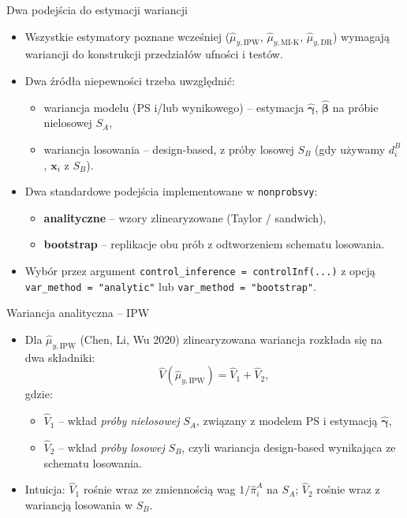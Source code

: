 \documentclass[10pt,ignorenonframetext, aspectratio=169]{beamer}
\newcommand{\bx}{\boldsymbol{x}}
\newcommand{\bbeta}{\boldsymbol{\beta}}
\newcommand{\bgamma}{\boldsymbol{\gamma}}
\begin{document}
\begin{frame}{Dwa podejścia do estymacji wariancji}
\begin{itemize}
\justifying
    \item Wszystkie estymatory poznane wcześniej ($\hat{\mu}_{y,\text{IPW}}$, $\hat{\mu}_{y,\text{MI-K}}$, $\hat{\mu}_{y,\text{DR}}$) wymagają wariancji do konstrukcji przedziałów ufności i testów.
    \item Dwa źródła niepewności trzeba uwzględnić:
    \begin{itemize}
        \item[(i)] wariancja modelu (PS i/lub wynikowego) -- estymacja $\hat{\bgamma}$, $\hat{\bbeta}$ na próbie nielosowej $S_A$,
        \item[(ii)] wariancja losowania -- design-based, z próby losowej $S_B$ (gdy używamy $d_i^B$, $\bx_i$ z $S_B$).
    \end{itemize}
    \item Dwa standardowe podejścia implementowane w \texttt{nonprobsvy}:
    \begin{itemize}
        \item \textbf{analityczne} -- wzory zlinearyzowane (Taylor / sandwich),
        \item \textbf{bootstrap} -- replikacje obu prób z odtworzeniem schematu losowania.
    \end{itemize}
    \item Wybór przez argument \texttt{control\_inference = controlInf(...)} z opcją \texttt{var\_method = "analytic"} lub \texttt{var\_method = "bootstrap"}.
\end{itemize}
\end{frame}

\begin{frame}{Wariancja analityczna -- IPW}
\begin{itemize}
\justifying
    \item Dla $\hat{\mu}_{y,\text{IPW}}$ (Chen, Li, Wu 2020) zlinearyzowana wariancja rozkłada się na dwa składniki:
    \begin{equation}
        \hat{V}(\hat{\mu}_{y,\text{IPW}}) = \hat{V}_1 + \hat{V}_2,
    \end{equation}
    gdzie:
    \begin{itemize}
        \item $\hat{V}_1$ -- wkład \emph{próby nielosowej} $S_A$, związany z modelem PS i estymacją $\hat{\bgamma}$,
        \item $\hat{V}_2$ -- wkład \emph{próby losowej} $S_B$, czyli wariancja design-based wynikająca ze schematu losowania.
    \end{itemize}
    \item Intuicja: $\hat{V}_1$ rośnie wraz ze zmiennością wag $1/\hat{\pi}_i^A$ na $S_A$; $\hat{V}_2$ rośnie wraz z wariancją losowania w $S_B$.
\end{itemize}
\end{frame}
\end{document}
